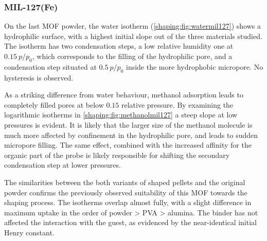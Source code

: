 \subsubsection{MIL-127(Fe)}

On the last \gls{MOF} powder, the water isotherm 
(\autoref{shaping:fig:watermil127}) shows a hydrophilic
surface, with a highest initial slope out of the three 
materials studied. The isotherm has two condensation steps,
a low relative humidity one at \(0.15~p/p_0\), which corresponds
to the filling of the hydrophilic pore, and a condensation 
step situated at \(0.5~p/p_0\) inside the more hydrophobic micropore.
No hysteresis is observed.

As a striking difference from water behaviour, methanol adsorption
leads to completely filled pores at below \(0.15\) relative 
pressure. By examining the logarithmic isotherms in 
\autoref{shaping:fig:methanolmil127} a steep slope at low
pressures is evident. It is likely that the larger size of the
methanol molecule is much more affected by confinement in 
the hydrophilic pore, and leads to sudden micropore filling.
The same effect, combined with the increased affinity for the 
organic part of the probe is likely responsible for shifting the 
secondary condensation step at lower pressures.

The similarities between the both variants of shaped pellets 
and the original powder confirms the previously observed 
suitability of this \gls{MOF} towards the shaping process. The isotherms
overlap almost fully, with a slight difference in maximum uptake
in the order of powder > \gls{PVA} > alumina. The binder has not affected
the interaction with the guest, as evidenced by the near-identical
initial Henry constant.